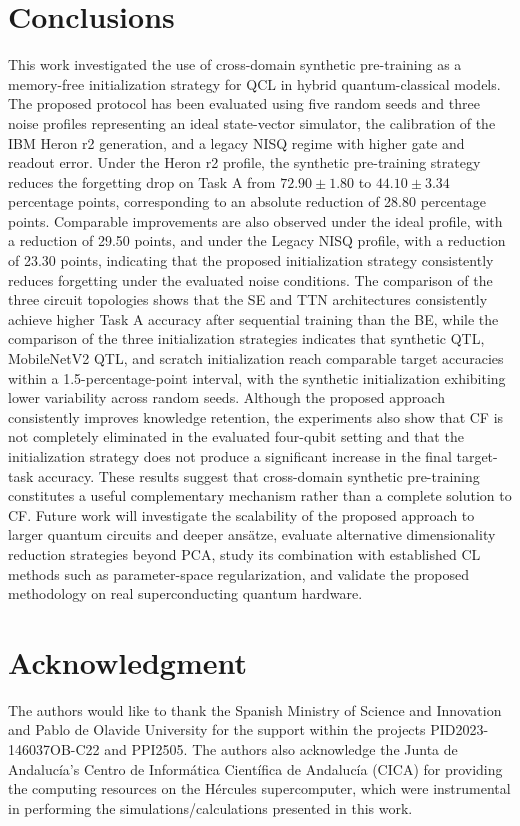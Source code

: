 \documentclass[conference]{IEEEtran}
\begin{document}
\section{Conclusions}
This work investigated the use of cross-domain synthetic pre-training as a memory-free initialization strategy for QCL in hybrid quantum-classical models. The proposed protocol has been evaluated using five random seeds and three noise profiles representing an ideal state-vector simulator, the calibration of the IBM Heron r2 generation, and a legacy NISQ regime with higher gate and readout error. Under the Heron r2 profile, the synthetic pre-training strategy reduces the forgetting drop on Task A from $72.90 \pm 1.80$ to $44.10 \pm 3.34$ percentage points, corresponding to an absolute reduction of 28.80 percentage points. Comparable improvements are also observed under the ideal profile, with a reduction of 29.50 points, and under the Legacy NISQ profile, with a reduction of 23.30 points, indicating that the proposed initialization strategy consistently reduces forgetting under the evaluated noise conditions. The comparison of the three circuit topologies shows that the SE and TTN architectures consistently achieve higher Task A accuracy after sequential training than the BE, while the comparison of the three initialization strategies indicates that synthetic QTL, MobileNetV2 QTL, and scratch initialization reach comparable target accuracies within a 1.5-percentage-point interval, with the synthetic initialization exhibiting lower variability across random seeds. Although the proposed approach consistently improves knowledge retention, the experiments also show that CF is not completely eliminated in the evaluated four-qubit setting and that the initialization strategy does not produce a significant increase in the final target-task accuracy. These results suggest that cross-domain synthetic pre-training constitutes a useful complementary mechanism rather than a complete solution to CF. Future work will investigate the scalability of the proposed approach to larger quantum circuits and deeper ans\"atze, evaluate alternative dimensionality reduction strategies beyond PCA, study its combination with established CL methods such as parameter-space regularization, and validate the proposed methodology on real superconducting quantum hardware.

\section*{Acknowledgment}
The authors would like to thank the Spanish Ministry of Science and Innovation and Pablo de Olavide University for the support within the projects PID2023-146037OB-C22 and PPI2505. The authors also acknowledge the Junta de Andaluc\'ia's Centro de Inform\'atica Cient\'ifica de Andaluc\'ia (CICA) for providing the computing resources on the H\'ercules supercomputer, which were instrumental in performing the simulations/calculations presented in this work.
\end{document}
